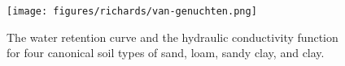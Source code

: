 \begin{figure}[ht]
\begin{center}
\texttt{[image: figures/richards/van-genuchten.png]}
\end{center}
\caption{The water retention curve and the hydraulic conductivity function for four canonical soil types of sand, loam, sandy clay, and clay.}
\label{fig:van-genuchten}
\end{figure}
